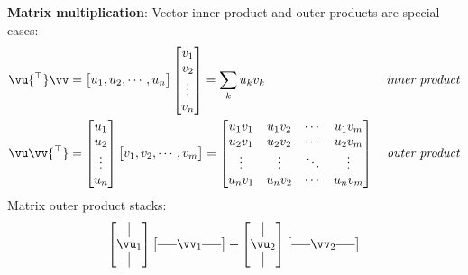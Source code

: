 \documentclass[a4paper,11pt]{exam}
\newcounter{ct}
\newcommand{\horzbar}{\rule[.5ex]{1.5em}{0.4pt}}
\newcommand{\trp}{{^\top}} %
\begin{document}
\begin{questions}
\begin{tcolorbox}[colback=black!1!,title=Matrix Fun Facts]
\textbf{Matrix multiplication}:
\noindent
Vector inner product and outer products are special cases:
\begin{align}
    \vu\trp \vv &=
    \begin{bmatrix}
	u_1, u_2, \cdots, u_n
    \end{bmatrix}
    \begin{bmatrix}
	v_1\\v_2\\\vdots\\ v_n
    \end{bmatrix}
    =
    \sum_k u_k v_k
    \,&
    \text{\emph{inner product}}
    \\
    \vu \vv\trp &=
    \begin{bmatrix}
	u_1\\u_2\\\vdots\\ u_n
    \end{bmatrix}
    \begin{bmatrix}
	v_1, v_2, \cdots, v_m
    \end{bmatrix}
    =
    \begin{bmatrix}
	u_1 v_1 & u_1 v_2 & \cdots & u_1 v_m
	\\
	u_2 v_1 & u_2 v_2 & \cdots & u_2 v_m
	\\
	\vdots & \vdots & \ddots & \vdots
	\\
	u_n v_1 & u_n v_2 & \cdots & u_n v_m
    \end{bmatrix}
    \,&
    \text{\emph{outer product}}
\end{align}
Matrix outer product stacks:
\begin{align}
    \begin{bmatrix}
	\kern.3em\vline\kern.3em \\
	\vu_1 \\
	\kern.3em\vline\kern.3em
    \end{bmatrix}
    \begin{bmatrix}
	\horzbar \vv_1 \horzbar
    \end{bmatrix}
    +
    \begin{bmatrix}
	\kern.3em\vline\kern.3em \\
	\vu_2 \\
	\kern.3em\vline\kern.3em
    \end{bmatrix}
    \begin{bmatrix}
	\horzbar \vv_2 \horzbar
    \end{bmatrix}

\end{align}
\end{tcolorbox}
\end{questions}
\end{document}
